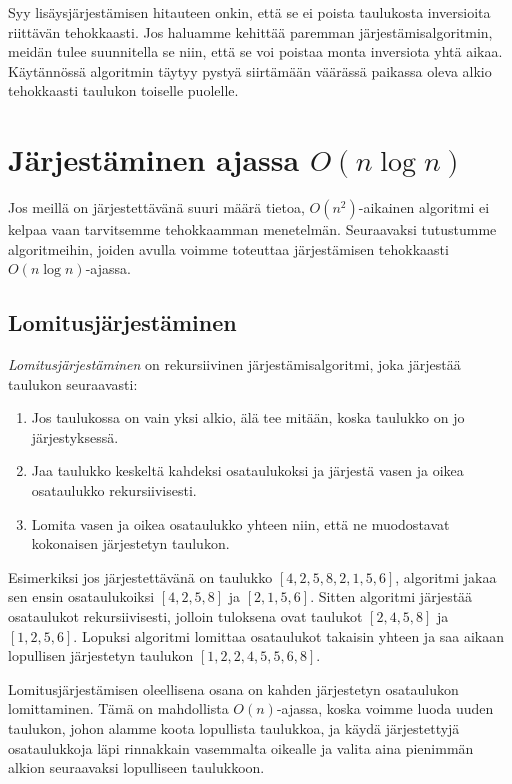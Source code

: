Syy lisäysjärjestämisen hitauteen onkin,
että se ei poista taulukosta inversioita riittävän tehokkaasti.
Jos haluamme kehittää paremman järjestämis\-algoritmin,
meidän tulee suunnitella se niin, että se voi poistaa
monta inversiota yhtä aikaa.
Käytännössä algoritmin täytyy pystyä siirtämään
väärässä paikassa oleva alkio tehokkaasti taulukon
toiselle puolelle.

\section{Järjestäminen ajassa $O(n \log n)$}

Jos meillä on järjestettävänä suuri määrä tietoa,
$O(n^2)$-aikainen algoritmi ei kelpaa vaan tarvitsemme
tehokkaamman menetelmän.
Seuraavaksi tutustumme algoritmeihin,
joiden avulla voimme toteuttaa järjestämisen tehokkaasti $O(n \log n)$-ajassa.

\subsection{Lomitusjärjestäminen}

\emph{Lomitusjärjestäminen} on rekursiivinen järjestämisalgoritmi,
joka järjestää taulukon seuraavasti:

\begin{enumerate}
\item Jos taulukossa on vain yksi alkio,
älä tee mitään, koska taulukko on jo järjestyksessä.
\item Jaa taulukko keskeltä kahdeksi osataulukoksi ja järjestä
vasen ja oikea osataulukko rekursiivisesti.
\item Lomita vasen ja oikea osataulukko yhteen niin, että ne muodostavat
kokonaisen järjestetyn taulukon.
\end{enumerate}

Esimerkiksi jos järjestettävänä on taulukko $[4,2,5,8,2,1,5,6]$,
algoritmi jakaa sen ensin osataulukoiksi $[4,2,5,8]$ ja $[2,1,5,6]$.
Sitten algoritmi järjestää osataulukot rekursiivisesti,
jolloin tuloksena ovat taulukot $[2,4,5,8]$ ja $[1,2,5,6]$.
Lopuksi algoritmi lomittaa osataulukot takaisin yhteen
ja saa aikaan lopullisen järjestetyn taulukon $[1,2,2,4,5,5,6,8]$.

Lomitusjärjestämisen oleellisena osana on kahden järjestetyn osataulukon
lomittaminen. Tämä on mahdollista $O(n)$-ajassa, koska
voimme luoda uuden taulukon, johon alamme koota lopullista taulukkoa,
ja käydä järjestettyjä osataulukkoja läpi rinnakkain
vasemmalta oikealle ja valita aina pienimmän alkion seuraavaksi
lopulliseen taulukkoon.

